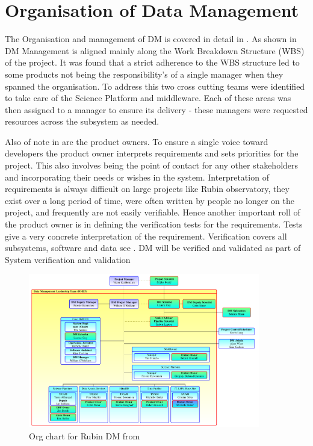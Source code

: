 
\section{Organisation of Data Management} \label{sec:org}

The Organisation and management of DM is covered in detail in \cite{LDM-294}.
As shown in  DM Management is aligned mainly along the Work Breakdown Structure (WBS) of the project.
It was found that a strict adherence to the WBS structure led to some products not being the responsibility's of a single manager when they spanned the organisation.
To address this two cross cutting teams were identified  to take care of the Science Platform and middleware.
Each of these areas was then assigned to a manager to ensure its delivery - these managers were requested resources across the subsystem as needed.

Also of note in  are the product owners.
To ensure a single voice toward developers the product owner interprets requirements and sets priorities for the
project.
This also involves being the point of contact for any other stakeholders and incorporating their needs or wishes in the system.
Interpretation of requirements is always difficult on large projects like Rubin observatory, they exist over a long period of time, were often written by people no longer on the project, and frequently are not easily verifiable.
Hence another important roll of the product owner is in defining the verification tests for the requirements.
Tests give a very concrete interpretation of the requirement.
Verification covers all subsystems, software and data  see \cite{PSTN-024}.
  DM will be verified and validated as part of System verification and validation \cite{2014SPIE.9150E..0NS} \cite {PSTN-029}



\begin{figure}
\includegraphics[width=0.9\textwidth]{images/DmOrg}
	\caption{Org chart for Rubin DM from \cite{LDM-294}\label{fig:org}}
\end{figure}

